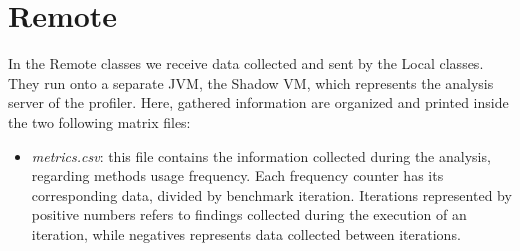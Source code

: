 \documentclass[]{usiinfthesis}
\begin{document}
\section{Remote}
In the Remote classes we receive data collected and sent by the Local classes. They run onto a separate JVM, the Shadow VM, which represents the analysis server of the profiler. Here, gathered information are organized and printed inside the two following matrix files:


\begin{itemize}
    \item \textit{metrics.csv}: this file contains the information collected during the analysis, regarding methods usage frequency. Each frequency counter has its corresponding data, divided by benchmark iteration. Iterations represented by positive numbers refers to findings collected during the execution of an iteration, while negatives represents data collected between iterations.
    

\end{itemize}
\end{document}

